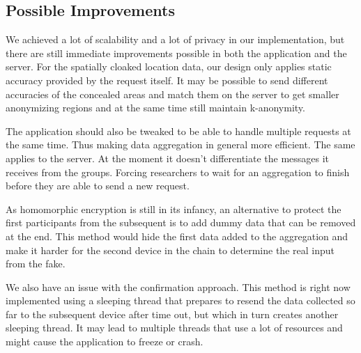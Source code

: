 \subsection{Possible Improvements}
We achieved a lot of scalability and a lot of privacy in our implementation, but there are still immediate improvements possible in both the application and the server. For the spatially cloaked location data, our design only applies static accuracy provided by the request itself. It may be possible to send different accuracies of the concealed areas and match them on the server to get smaller anonymizing regions and at the same time still maintain k-anonymity.

The application should also be tweaked to be able to handle multiple requests at the same time. Thus making data aggregation in general more efficient. The same applies to the server. At the moment it doesn't differentiate the messages it receives from the groups. Forcing researchers to wait for an aggregation to finish before they are able to send a new request.

As homomorphic encryption is still in its infancy, an alternative to protect the first participants from the subsequent is to add dummy data that can be removed at the end. This method would hide the first data added to the aggregation and make it harder for the second device in the chain to determine the real input from the fake.

We also have an issue with the confirmation approach. This method is right now implemented using a sleeping thread that prepares to resend the data collected so far to the subsequent device after time out, but which in turn creates another sleeping thread. It may lead to multiple threads that use a lot of resources and might cause the application to freeze or crash.

